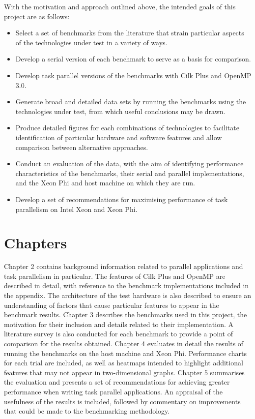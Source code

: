 \documentclass{report}
\begin{document}
With the motivation and approach outlined above, the intended goals of this project are as follows:
\begin{itemize}
	\item Select a set of benchmarks from the literature that strain particular aspects of the technologies under test in a variety of ways.
	\item Develop a serial version of each benchmark to serve as a basis for comparison.
	\item Develop task parallel versions of the benchmarks with Cilk Plus and OpenMP 3.0.
	\item Generate broad and detailed data sets by running the benchmarks using the technologies under test, from which useful conclusions may be drawn.
	\item Produce detailed figures for each combinations of technologies to facilitate identification of particular hardware and software features and allow comparison between alternative approaches.
	\item Conduct an evaluation of the data, with the aim of identifying performance characteristics of the benchmarks, their serial and parallel implementations, and the Xeon Phi and host machine on which they are run.
	\item Develop a set of recommendations for maximising performance of task parallelism on Intel Xeon and Xeon Phi.
\end{itemize}

\section{Chapters} \label{Sec:chapters}

Chapter 2 contains background information related to parallel applications and task parallelism in particular. The features of Cilk Plus and OpenMP are described in detail, with reference to the benchmark implementations included in the appendix. The architecture of the test hardware is also described to ensure an understanding of factors that cause particular features to appear in the benchmark results. Chapter 3 describes the benchmarks used in this project, the motivation for their inclusion and details related to their implementation. A literature survey is also conducted for each benchmark to provide a point of comparison for the results obtained. Chapter 4 evaluates in detail the results of running the benchmarks on the host machine and Xeon Phi. Performance charts for each trial are included, as well as heatmaps intended to highlight additional features that may not appear in two-dimensional graphs. Chapter 5 summarises the evaluation and presents a set of recommendations for achieving greater performance when writing task parallel applications. An appraisal of the usefulness of the results is included, followed by commentary on improvements that could be made to the benchmarking methodology.
\end{document}

